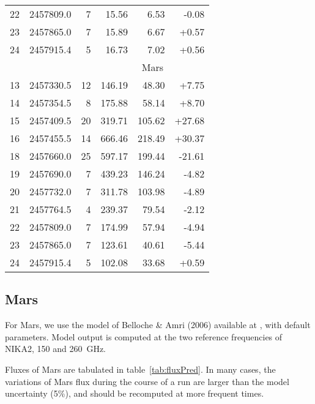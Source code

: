 \begin{table*}[!h]
\begin{tabular}{|l|r|r|r|r|r|}
22 & 2457809.0 &  7 & 15.56 & 6.53 & -0.08\\
23 & 2457865.0 &  7 & 15.89 & 6.67 & +0.57\\
24 & 2457915.4 &  5 & 16.73 & 7.02 & +0.56 \\
\hline
         &    &            & \multicolumn{3}{|c|}{Mars}\\
\hline
13 & 2457330.5 &  12 & 146.19 & 48.30 & +7.75\\
14 & 2457354.5 &  8 & 175.88 & 58.14 & +8.70\\
15 & 2457409.5 &  20 & 319.71 & 105.62 & +27.68\\
16 & 2457455.5 &  14 & 666.46 & 218.49 & +30.37\\
18 & 2457660.0 &  25 & 597.17 & 199.44 & -21.61\\
19 & 2457690.0 &  7 & 439.23 & 146.24 & -4.82\\
20 & 2457732.0 &  7 & 311.78 & 103.98 & -4.89\\
21 & 2457764.5 &  4 & 239.37 & 79.54 & -2.12\\
22 & 2457809.0 &  7 & 174.99 & 57.94 & -4.94\\
23 & 2457865.0 &  7 & 123.61 & 40.61 & -5.44\\
24 & 2457915.4 &  5 & 102.08 & 33.68 & +0.59 \\
\hline

\end{tabular}
\label{tab:fluxPred}
\end{table*}


\subsection{Mars}
For Mars, we use the model of Belloche \&  Amri (2006) available at
\cite{beloche},
with default parameters. Model output is computed at the two reference
frequencies of NIKA2, 150 and 260~GHz.

Fluxes of Mars are tabulated in table~\ref{tab:fluxPred}. In many
cases, the variations of Mars flux during the course of a run are
larger than the model uncertainty (5\%), and should be recomputed at
more frequent times. 


